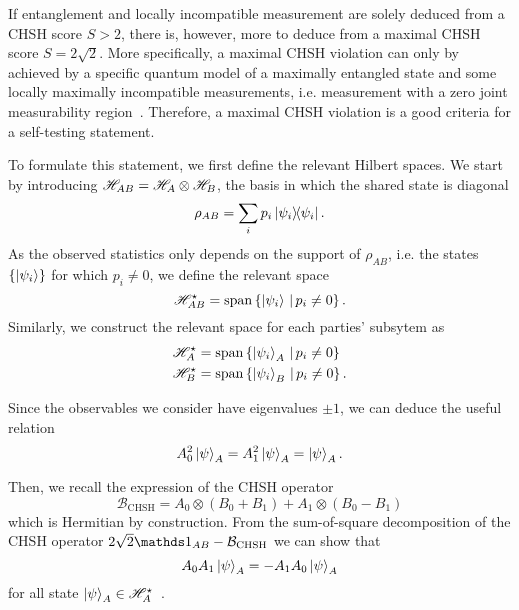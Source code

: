 \medbreak

If entanglement and locally incompatible measurement are solely deduced from a CHSH score $S>2$, there is, however, more to deduce from a maximal CHSH score $S=2\sqrt{2}$.
More specifically, a maximal CHSH violation can only by achieved by a specific quantum model of a maximally entangled state and some locally maximally incompatible measurements, i.e. measurement with a zero joint measurability region~\cite{Summers1987,Popescu92,Tsirelson1993}.
Therefore, a maximal CHSH violation is a good criteria for a self-testing statement.

To formulate this statement, we first define the relevant Hilbert spaces.
We start by introducing $\mathscr{H}_{AB}= \mathscr{H}_A \otimes \mathscr{H}_B$, the basis in which the shared state is diagonal
\begin{equation}
	\rho_{AB} = \sum_i p_i \ketbra{\psi_i}	.
\end{equation}
As the observed statistics only depends on the support of $\rho_{AB}$, i.e. the states $\{\ket{\psi_i}\}$ for which $p_i\neq0$, we define the relevant space
\begin{equation}
	\mathscr{H}_{AB}^\star = \mathrm{span}\left\{ {\ket{\psi_i}\, | \, p_i \neq 0} \right\}.
\end{equation}
Similarly, we construct the relevant space for each parties' subsytem as
\begin{equation}
	\begin{split}
		\mathscr{H} _A^\star &= \mathrm{span}\left\{ {\ket{\psi_i}_A\, | \, p_i \neq 0} \right\} \\
		\mathscr{H} _B^\star &= \mathrm{span}\left\{ {\ket{\psi_i}_B\, | \, p_i \neq 0} \right\}.
	\end{split}
\end{equation}

Since the observables we consider have eigenvalues $\pm 1$, we can deduce the useful relation
\begin{equation}
	A_0^2 \ket{\psi}_A = A_1^2 \ket{\psi}_A = \ket{\psi}_A.
	\label{eq:involutory}
\end{equation}

Then, we recall the expression of the CHSH operator
\begin{equation}
	\mathcal{B}_{\mathrm{CHSH}} = A_0 \otimes \left( B_0 + B_1 \right) + A_1 \otimes \left( B_0 - B_1 \right)
\end{equation}
which is Hermitian by construction.
From the sum-of-square decomposition of the CHSH operator $2\sqrt{2}\id_{AB} - \mathcal{B}_\text{CHSH}$ we can show that
\begin{equation}
	A_0 A_1 \ket{\psi}_A = -A_1 A_0 \ket{\psi}_A 
	\label{eq:anticom}
\end{equation}
for all state $\ket{\psi}_A \in \mathscr{H}_A^\star$~\cite{Pironio2010,Supic2019}.

